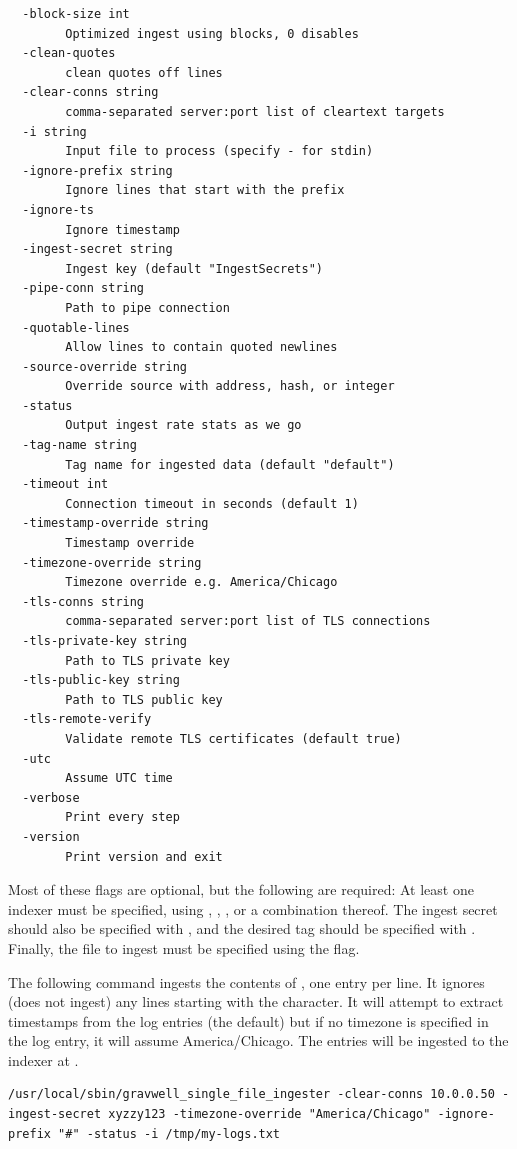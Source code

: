 \begin{verbatim}
  -block-size int
    	Optimized ingest using blocks, 0 disables
  -clean-quotes
    	clean quotes off lines
  -clear-conns string
    	comma-separated server:port list of cleartext targets
  -i string
    	Input file to process (specify - for stdin)
  -ignore-prefix string
    	Ignore lines that start with the prefix
  -ignore-ts
    	Ignore timestamp
  -ingest-secret string
    	Ingest key (default "IngestSecrets")
  -pipe-conn string
    	Path to pipe connection
  -quotable-lines
    	Allow lines to contain quoted newlines
  -source-override string
    	Override source with address, hash, or integer
  -status
    	Output ingest rate stats as we go
  -tag-name string
    	Tag name for ingested data (default "default")
  -timeout int
    	Connection timeout in seconds (default 1)
  -timestamp-override string
    	Timestamp override
  -timezone-override string
    	Timezone override e.g. America/Chicago
  -tls-conns string
    	comma-separated server:port list of TLS connections
  -tls-private-key string
    	Path to TLS private key
  -tls-public-key string
    	Path to TLS public key
  -tls-remote-verify
    	Validate remote TLS certificates (default true)
  -utc
    	Assume UTC time
  -verbose
    	Print every step
  -version
    	Print version and exit
\end{verbatim}

Most of these flags are optional, but the following are required: At least one indexer must be specified, using , , , or a combination thereof. The ingest secret should also be specified with , and the desired tag should be specified with . Finally, the file to ingest must be specified using the  flag.

The following command ingests the contents of , one entry per line. It ignores (does not ingest) any lines starting with the \code{\#} character. It will attempt to extract timestamps from the log entries (the default) but if no timezone is specified in the log entry, it will assume America/Chicago. The entries will be ingested to the indexer at .

\begin{verbatim}
/usr/local/sbin/gravwell_single_file_ingester -clear-conns 10.0.0.50 -ingest-secret xyzzy123 -timezone-override "America/Chicago" -ignore-prefix "#" -status -i /tmp/my-logs.txt
\end{verbatim}

